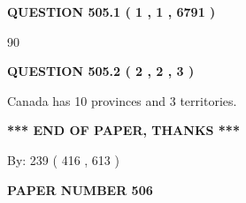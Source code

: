 \documentclass[12pt]{article}
\begin{document}
   
   
   
 \vspace{0.2in}
 
 
 
 
   
   
  
\vspace{0.2in}
  
{\textbf{\Large{QUESTION
505.1 
 ( 1 , 1 , 6791 )
}}}
  
  
 
 
\noindent{}

90
 
 
  
\vspace{0.2in}
  
{\textbf{\Large{QUESTION
505.2 
 ( 2 , 2 , 3 )
}}}
  
  
 
 
\noindent{}
 
 
Canada has 10  provinces and 3 territories.
 
 
 
 
   
   
 \vspace{0.2in}
 
   
   
   
   
\vspace{1.0in} 
{\textbf{\large{ *** END OF PAPER, THANKS *** }}} 
   
   
\hspace{1.0in} By: 
 239 ( 416 ,  613 )
   
   
   
   
\newpage 
\setcounter{page}{ 
   506001 } 
   
   
   
   
 {\textbf{ \Large{ PAPER NUMBER  506  }}}
   
   
\vspace{0.2in}
   
   
   
   
   
   
 \vspace{0.2in}
 
 
 
 
   
\end{document}
